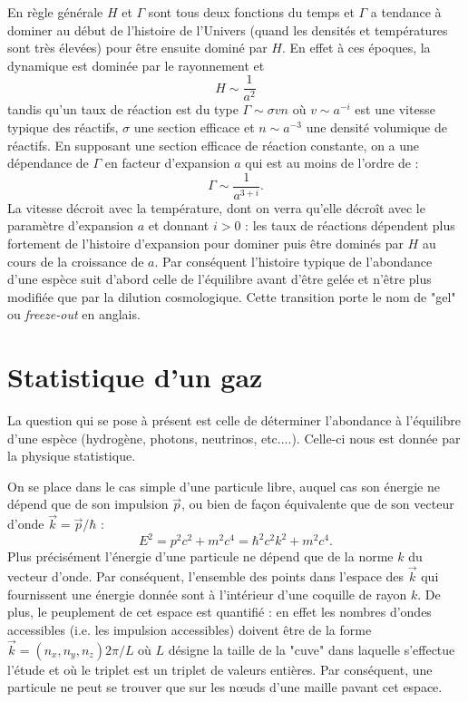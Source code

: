 En règle générale $H$ et $\Gamma$ sont tous deux fonctions du temps et $\Gamma$ a tendance à dominer au début de l'histoire de l'Univers (quand les densités et températures sont très élevées) pour être ensuite dominé par $H$. En effet à ces époques, la dynamique est dominée par le rayonnement et 
\begin{equation}
H\sim\frac{1}{a^2}
\end{equation}
tandis qu'un taux de réaction est du type $\Gamma\sim \sigma v n$ où $v\sim a^{-i}$ est une vitesse typique des réactifs, $\sigma$ une section efficace et $n\sim a^{-3}$ une densité volumique de réactifs. En supposant une section efficace de réaction constante, on a une dépendance de $\Gamma$ en facteur d'expansion $a$ qui est au moins de l'ordre de :
\begin{equation}
\Gamma \sim \frac{1}{a^{3+i}}.
\end{equation}
La vitesse décroit avec la température, dont on verra qu'elle décroît avec le paramètre d'expansion $a$ et donnant $i>0$ : les taux de réactions dépendent plus fortement de l'histoire d'expansion pour dominer puis être dominés par $H$ au cours de la croissance de $a$. Par conséquent l'histoire typique de l'abondance d'une espèce suit d'abord celle de l'équilibre avant d'être gelée et n'être plus modifiée que par la dilution cosmologique. Cette transition porte le nom de "gel" ou \textit{freeze-out} en anglais.



\section{Statistique d'un gaz}
La question qui se pose à présent est celle de déterminer l'abondance à l'équilibre d'une espèce (hydrogène, photons, neutrinos, etc....). Celle-ci nous est donnée par la physique statistique.

On se place dans le cas simple d'une particule libre, auquel cas son énergie ne dépend que de son impulsion $\vec p$, ou bien de façon équivalente que de son vecteur d'onde $\vec k =\vec p /\hbar$ :
\begin{equation}
E^2=p^2c^2+m^2c^4=\hbar^2 c^2 k^2 +m^2c^4.
\end{equation}
 Plus précisément l'énergie d'une particule ne dépend que de la norme $k$ du vecteur d'onde. Par conséquent, l'ensemble des points dans l'espace des $\vec k$ qui fournissent une énergie donnée sont à l'intérieur d'une coquille de rayon $k$. De plus, le peuplement de cet espace est quantifié : en effet les nombres d'ondes accessibles (i.e. les impulsion accessibles) doivent être de la forme $\vec k = (n_x,n_y,n_z) 2\pi/L $ où $L$ désigne la taille de la "cuve" dans laquelle s'effectue l'étude et où le triplet est un triplet de valeurs entières. Par conséquent, une particule ne peut se trouver que sur les nœuds d'une maille pavant cet espace. 

